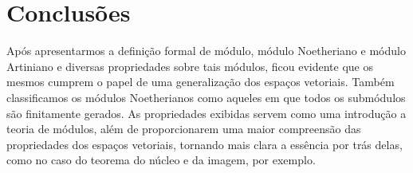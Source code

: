 \section*{Conclusões}

\recuo Após apresentarmos a definição formal de módulo, módulo Noetheriano e módulo Artiniano e diversas propriedades sobre tais módulos, ficou evidente que os mesmos cumprem o papel de uma generalização dos espaços vetoriais. Também classificamos os módulos Noetherianos como aqueles em que todos os submódulos são finitamente gerados. As propriedades exibidas servem como uma introdução a teoria de módulos, além de proporcionarem uma maior compreensão das propriedades dos espaços vetoriais, tornando mais clara a essência por trás delas, como no caso do teorema do núcleo e da imagem, por exemplo.

\printbibliography

